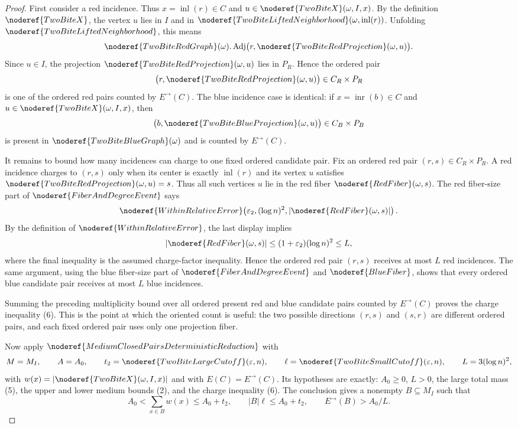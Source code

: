 \begin{proof}
First consider a red incidence.  Thus \(x=\operatorname{inl}(r)\in C\) and
\(u\in\noderef{TwoBiteX}(\omega,I,x)\).  By the definition
\(\noderef{TwoBiteX}\), the vertex \(u\) lies in \(I\) and in
\(\noderef{TwoBiteLiftedNeighborhood}(\omega,\operatorname{inl}(r))\).
Unfolding \(\noderef{TwoBiteLiftedNeighborhood}\), this means
\[
\noderef{TwoBiteRedGraph}(\omega).\operatorname{Adj}
  \bigl(r,\noderef{TwoBiteRedProjection}(\omega,u)\bigr).
\]
Since \(u\in I\), the projection
\(\noderef{TwoBiteRedProjection}(\omega,u)\) lies in \(P_R\).  Hence the
ordered pair
\[
\bigl(r,\noderef{TwoBiteRedProjection}(\omega,u)\bigr)\in C_R\times P_R
\]
is one of the ordered red pairs counted by \(E^\rightarrow(C)\).  The blue
incidence case is identical: if \(x=\operatorname{inr}(b)\in C\) and
\(u\in\noderef{TwoBiteX}(\omega,I,x)\), then
\[
\bigl(b,\noderef{TwoBiteBlueProjection}(\omega,u)\bigr)\in C_B\times P_B
\]
is present in \(\noderef{TwoBiteBlueGraph}(\omega)\) and is counted by
\(E^\rightarrow(C)\).

It remains to bound how many incidences can charge to one fixed ordered
candidate pair.  Fix an ordered red pair \((r,s)\in C_R\times P_R\).  A red
incidence charges to \((r,s)\) only when its center is exactly
\(\operatorname{inl}(r)\) and its vertex \(u\) satisfies
\(\noderef{TwoBiteRedProjection}(\omega,u)=s\).  Thus all such vertices
\(u\) lie in the red fiber \(\noderef{RedFiber}(\omega,s)\).  The red
fiber-size part of \(\noderef{FiberAndDegreeEvent}\) says
\[
\noderef{WithinRelativeError}\!\left(
  \varepsilon_2,(\log n)^2,|\noderef{RedFiber}(\omega,s)|\right).
\]
By the definition of \(\noderef{WithinRelativeError}\), the last display
implies
\[
|\noderef{RedFiber}(\omega,s)|
\le (1+\varepsilon_2)(\log n)^2
\le L,
\]
where the final inequality is the assumed charge-factor inequality.  Hence
the ordered red pair \((r,s)\) receives at most \(L\) red incidences.  The same
argument, using the blue fiber-size part of \(\noderef{FiberAndDegreeEvent}\)
and \(\noderef{BlueFiber}\), shows that every ordered blue candidate pair
receives at most \(L\) blue incidences.

Summing the preceding multiplicity bound over all ordered present red and
blue candidate pairs counted by \(E^\rightarrow(C)\) proves the charge
inequality (6).  This is the point at which the oriented count is useful: the
two possible directions \((r,s)\) and \((s,r)\) are different ordered pairs,
and each fixed ordered pair uses only one projection fiber.

Now apply \(\noderef{MediumClosedPairsDeterministicReduction}\) with
\[
M=M_I,\qquad A=A_0,\qquad
t_2=\noderef{TwoBiteLargeCutoff}(\varepsilon,n),\qquad
\ell=\noderef{TwoBiteSmallCutoff}(\varepsilon,n),\qquad
L=3(\log n)^2,
\]
with \(w(x)=|\noderef{TwoBiteX}(\omega,I,x)|\) and with
\(E(C)=E^\rightarrow(C)\).  Its hypotheses are exactly: \(A_0\ge0\), \(L>0\),
the large total mass (5), the upper and lower medium bounds (2), and the
charge inequality (6).  The conclusion gives a nonempty \(B\subseteq M_I\)
such that
\[
A_0<\sum_{x\in B}w(x)\le A_0+t_2,\qquad
|B|\ell\le A_0+t_2,\qquad E^\rightarrow(B)>A_0/L. \tag{7}
\]


\end{proof}
